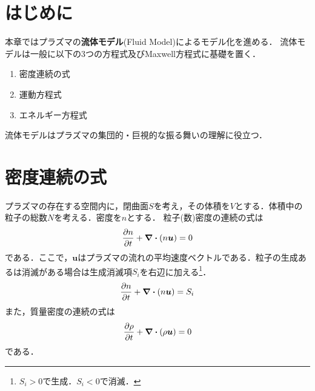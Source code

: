 \documentclass{report}
\begin{document}
  \section{はじめに}
    本章ではプラズマの\textbf{流体モデル}(Fluid Model)によるモデル化を進める．
    流体モデルは一般に以下の3つの方程式及びMaxwell方程式に基礎を置く．
    \begin{enumerate}
      \item 密度連続の式
      \item 運動方程式
      \item エネルギー方程式
    \end{enumerate}
    流体モデルはプラズマの集団的・巨視的な振る舞いの理解に役立つ．
  
  \section{密度連続の式}
    プラズマの存在する空間内に，閉曲面$S$を考え，その体積を$V$とする．体積中の粒子の総数$N$を考える．密度を$n$とする．
    粒子(数)密度の連続の式は
    \begin{align}
      \pdv{n}{t} + \div(n \bm{u}) = 0
    \end{align}
    である．ここで，$\bm{u}$はプラズマの流れの平均速度ベクトルである．粒子の生成あるは消滅がある場合は生成消滅項$S_i$を右辺に加える\footnote{$S_i>0$で生成．$S_i<0$で消滅．}．
    \begin{align}
      \pdv{n}{t} + \div(n \bm{u}) = S_i
    \end{align}
    また，質量密度の連続の式は
    \begin{align}
      \pdv{\rho}{t} + \div(\rho \bm{u}) = 0
    \end{align}
    である．
\end{document}
